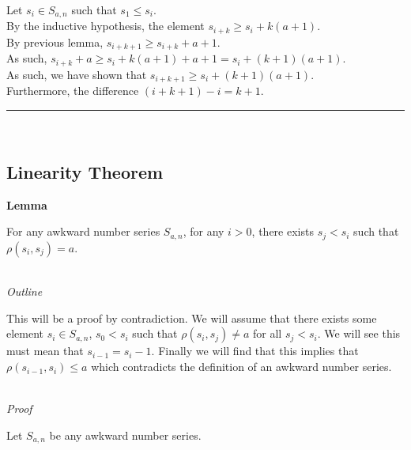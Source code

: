 \documentclass[a4paper,12pt]{article}
\begin{document}
\noindent Let $s_i \in S_{a, n}$ such that $s_1 \leq s_i$.\\

\noindent By the inductive hypothesis, the element $s_{i + k} \geq s_i + k(a + 1)$.\\

\noindent By previous lemma, $s_{i + k + 1} \geq s_{i + k} + a + 1$.\\

\noindent As such, $s_{i + k} + a \geq s_i + k(a + 1) + a + 1 = s_i + (k + 1)(a + 1)$.\\

\noindent As such, we have shown that $s_{i + k + 1} \geq s_i + (k + 1)(a + 1)$.\\

\noindent Furthermore, the difference $(i + k + 1) - i = k + 1$.

\begin{center}
\noindent\rule{8cm}{0.4pt}
\end{center}
\noindent \\



\subsection{Linearity Theorem}



\label{lemma:relation_to_other}
\hypertarget{lemma:relation_to_other}{}
\begin{tcolorbox}
\textbf{Lemma}

For any awkward number series $S_{a,n}$, for any $i > 0$, there exists $s_j < s_i$ such that $\rho(s_i, s_j) = a$.

\end{tcolorbox}

\noindent \\
\textit{Outline}

\noindent This will be a proof by contradiction. We will assume that there exists some element $s_i \in S_{a,n}$, $s_0 < s_i$ such that $\rho(s_i, s_j) \neq a$ for all $s_j < s_i$. We will see this must mean that $s_{i - 1} = s_i - 1$. Finally we will find that this implies that $\rho(s_{i - 1}, s_i) \leq a$ which contradicts the definition of an awkward number series.

\noindent \\
\textit{Proof}

\noindent Let $S_{a, n}$ be any awkward number series.\\
\end{document}
